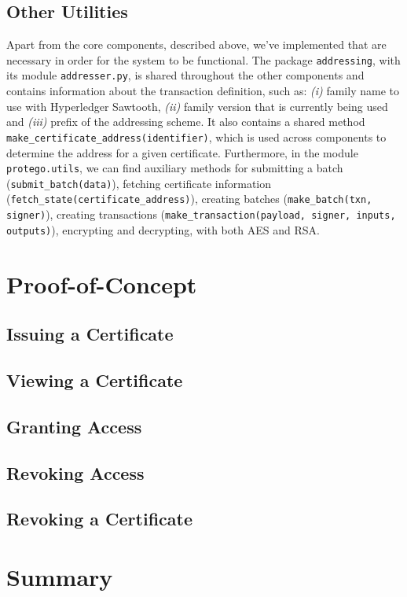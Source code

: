 \subsection{Other Utilities}

Apart from the core components, described above, we've implemented that are necessary in order for the system to be functional. The package \texttt{addressing}, with its module \texttt{addresser.py}, is shared throughout the other components and contains  information about the transaction definition, such as: \emph{(i)} family name to use with Hyperledger Sawtooth, \emph{(ii)} family version that is currently being used and \emph{(iii)} prefix of the addressing scheme. It also contains a shared method \texttt{make\_certificate\_address(identifier)}, which is used across components to determine the address for a given certificate. Furthermore, in the module \texttt{protego.utils}, we can find auxiliary methods for submitting a batch (\texttt{submit\_batch(data)}), fetching certificate information (\texttt{fetch\_state(certificate\_address)}), creating batches (\texttt{make\_batch(txn, signer)}), creating transactions (\texttt{make\_transaction(payload, signer, inputs, outputs)}), encrypting and decrypting, with both AES and RSA.

\section{Proof-of-Concept}
\label{sec:implementation-poc}

\subsection{Issuing a Certificate}

\subsection{Viewing a Certificate}

\subsection{Granting Access}

\subsection{Revoking Access}

\subsection{Revoking a Certificate}

\section{Summary}


